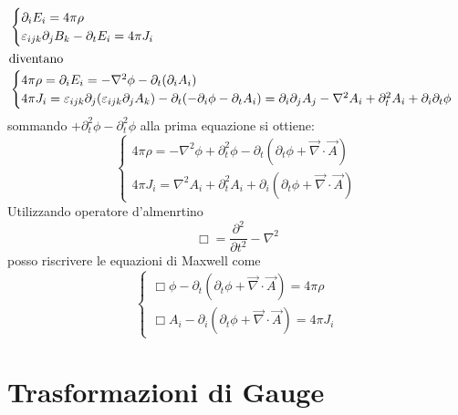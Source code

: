 \begin{align*}
    &\begin{cases}
        \partial_iE_i = 4\pi \rho  \\
        \varepsilon_{ijk} \partial_jB_k - \partial_t E_i = 4 \pi J_i 
    \end{cases} \\
    \intertext{diventano} 
    &\begin{cases}
        4\pi \rho = \partial_iE_i = - \nabla^2 \phi - \partial_t (\partial_iA_i) \\
        4 \pi J_i = \varepsilon_{ijk} \partial_j (\varepsilon_{ijk} \partial_j A_k) - \partial_t (-\partial_i \phi - \partial_t A_i) = \partial_i\partial_j A_j - \nabla^2 A_i + \partial^2_t A_i + \partial_i\partial_t\phi
    \end{cases}
\end{align*}
sommando $+ \partial_t^2 \phi - \partial_t^2 \phi$ alla prima equazione si ottiene:
\begin{equation*}
    \begin{cases}
        4 \pi \rho = - \nabla^2 \phi + \partial_t^2 \phi - \partial_t (\partial_t \phi + \vec{\nabla} \cdot \vec{A}) \\
        4 \pi J_i = \nabla^2 A_i + \partial_t^2 A_i +\partial_i (\partial_t \phi + \vec{\nabla} \cdot \vec{A})
    \end{cases}
\end{equation*}
Utilizzando operatore d'almenrtino 
\begin{equation*}
    \Box = \frac{\partial^2}{\partial t^2 } - \nabla^2
\end{equation*}
posso riscrivere le equazioni di Maxwell come
\begin{equation*}
    \boxed{
    \begin{cases}
        \Box \phi - \partial_t (\partial_t \phi + \vec{\nabla} \cdot \vec{A}) = 4 \pi \rho \\
        \Box A_i - \partial_i (\partial_t \phi + \vec{\nabla} \cdot \vec{A}) = 4 \pi J_i
    \end{cases}}
\end{equation*}

\section*{Trasformazioni di Gauge}

